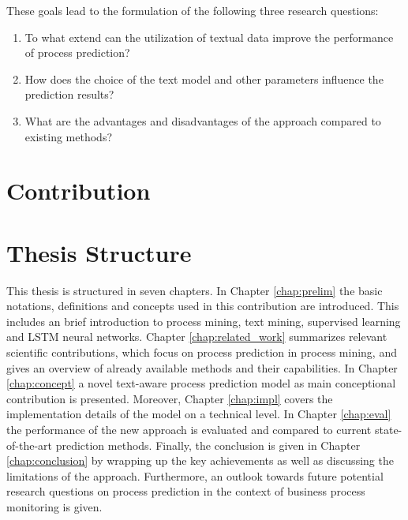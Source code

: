 These goals lead to the formulation of the following three research questions:

\begin{enumerate}
	\item To what extend can the utilization of textual data improve the performance of process prediction?
	\item How does the choice of the text model and other parameters influence the prediction results?
	\item What are the advantages and disadvantages of the approach compared to existing methods?
\end{enumerate}



\section{Contribution}



\section{Thesis Structure}

This thesis is structured in seven chapters.
In Chapter \ref{chap:prelim} the basic notations, definitions and concepts used in this contribution are introduced.
This includes an brief introduction to process mining, text mining, supervised learning and LSTM neural networks.
Chapter \ref{chap:related_work} summarizes relevant scientific contributions, which focus on process prediction in process mining, and gives an overview of already available methods and their capabilities.
In Chapter \ref{chap:concept} a novel text-aware process prediction model as main conceptional contribution is presented.
Moreover, Chapter \ref{chap:impl} covers the implementation details of the model on a technical level.
In Chapter \ref{chap:eval} the performance of the new approach is evaluated and compared to current state-of-the-art prediction methods.
Finally, the conclusion is given in Chapter \ref{chap:conclusion} by wrapping up the key achievements as well as discussing the limitations of the approach.
Furthermore, an outlook towards future potential research questions on process prediction in the context of business process monitoring is given.